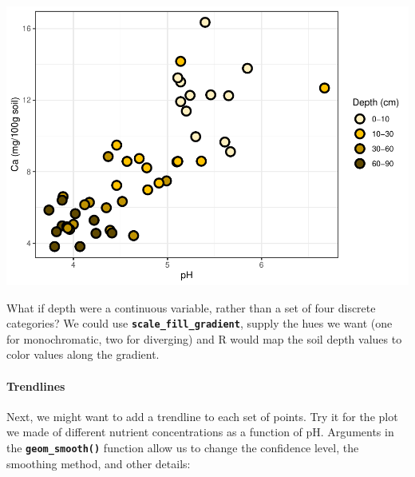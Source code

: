 \documentclass[
]{article}
\begin{document}
\includegraphics{module1_3_files/figure-latex/unnamed-chunk-35-1.pdf}

What if depth were a continuous variable, rather than a set of four
discrete categories? We could use
\textbf{\texttt{scale\_fill\_gradient}}, supply the hues we want (one
for monochromatic, two for diverging) and R would map the soil depth
values to color values along the gradient.

\hypertarget{trendlines}{%
\paragraph{Trendlines}\label{trendlines}}

Next, we might want to add a trendline to each set of points. Try it for
the plot we made of different nutrient concentrations as a function of
pH. Arguments in the \textbf{\texttt{geom\_smooth()}} function allow us
to change the confidence level, the smoothing method, and other details:
\end{document}
